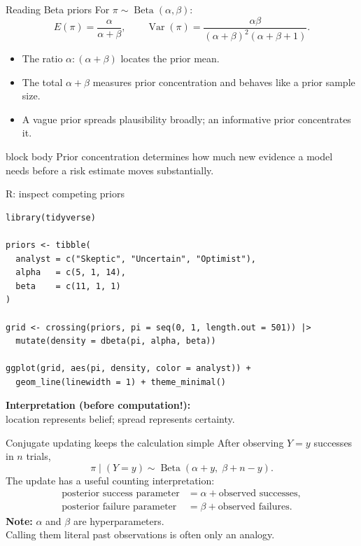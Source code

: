 \documentclass[aspectratio=43,11pt]{beamer}
\newcommand{\riskbox}[1]{\begin{beamercolorbox}[rounded=true,sep=.8em]{block body} #1\end{beamercolorbox}}
\begin{document}
\begin{frame}{Reading Beta priors}
For $\pi\sim\operatorname{Beta}(\alpha,\beta)$:
\[
E(\pi)=\frac{\alpha}{\alpha+\beta}, \qquad
\operatorname{Var}(\pi)=\frac{\alpha\beta}{(\alpha+\beta)^2(\alpha+\beta+1)}.
\]
\begin{itemize}
  \item The ratio $\alpha:(\alpha+\beta)$ locates the prior mean.
  \item The total $\alpha+\beta$ measures prior concentration and behaves like a prior sample size.
  \item A vague prior spreads plausibility broadly; an informative prior concentrates it.
\end{itemize}
\riskbox{Prior concentration determines how much new evidence a model needs before a risk estimate moves substantially.}
\end{frame}

\begin{frame}[fragile]{R: inspect competing priors}
\begin{lstlisting}
library(tidyverse)

priors <- tibble(
  analyst = c("Skeptic", "Uncertain", "Optimist"),
  alpha   = c(5, 1, 14),
  beta    = c(11, 1, 1)
)

grid <- crossing(priors, pi = seq(0, 1, length.out = 501)) |>
  mutate(density = dbeta(pi, alpha, beta))

ggplot(grid, aes(pi, density, color = analyst)) +
  geom_line(linewidth = 1) + theme_minimal()
\end{lstlisting}
\textbf{Interpretation (before computation!):}\\
location represents belief; spread represents certainty.
\end{frame}

\begin{frame}{Conjugate updating keeps the calculation simple}
After observing $Y=y$ successes in $n$ trials,
\[
\pi\mid(Y=y)\sim\operatorname{Beta}(\alpha+y,\;\beta+n-y).
\]
The update has a useful counting interpretation:
\begin{align*}
\text{posterior success parameter} &= \alpha + \text{observed successes},\\
\text{posterior failure parameter} &= \beta + \text{observed failures}.
\end{align*}
\textbf{Note:} $\alpha$ and $\beta$ are hyperparameters.\\
Calling them literal past observations is often only an analogy.
\end{frame}
\end{document}
